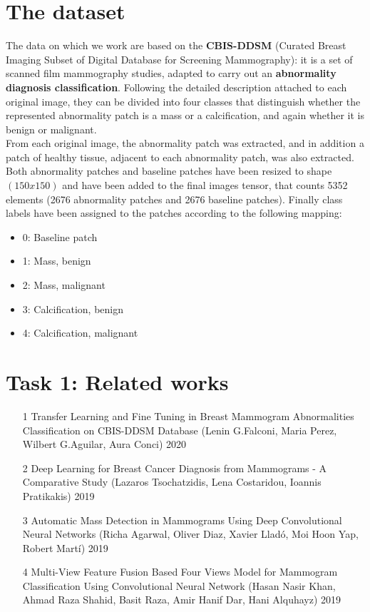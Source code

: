 \documentclass[11pt,a4paper,oneside]{article}
\begin{document}
\section{The dataset}
The data on which we work are based on the \textbf{CBIS-DDSM} (Curated Breast Imaging Subset of Digital Database for Screening Mammography): it is a set of scanned film mammography studies, adapted to carry out an \textbf{abnormality diagnosis classification}. Following the detailed description attached to each original image, they can be divided into four classes that distinguish whether the represented abnormality patch is a mass or a calcification, and again whether it is benign or malignant. \\
From each original image, the abnormality patch was extracted, and in addition a patch of healthy tissue, adjacent to each abnormality patch, was also extracted. Both abnormality patches and baseline patches have been resized to shape $(150x150)$ and have been added to the final images tensor, that counts 5352 elements (2676 abnormality patches and 2676 baseline patches).
Finally class labels have been assigned to the patches according to the following mapping:
\begin{itemize}
\item 0: Baseline patch
\item 1: Mass, benign
\item 2: Mass, malignant
\item 3: Calcification, benign
\item 4: Calcification, malignant
\end{itemize}

\section{Task 1: Related works}
\begin{itemize}
\item [1] Transfer Learning and Fine Tuning in Breast Mammogram Abnormalities Classification on CBIS-DDSM Database (Lenin G.Falconi, Maria Perez, Wilbert G.Aguilar, Aura Conci) 2020
\item [2] Deep Learning for Breast Cancer Diagnosis from Mammograms - A Comparative Study (Lazaros Tsochatzidis, Lena Costaridou, Ioannis Pratikakis) 2019
\item [3] Automatic Mass Detection in Mammograms Using Deep Convolutional Neural Networks (Richa Agarwal, Oliver Diaz, Xavier Lladó, Moi Hoon Yap, Robert Martí) 2019
\item [4] Multi-View Feature Fusion Based Four Views Model for Mammogram Classification Using Convolutional Neural Network (Hasan Nasir Khan, Ahmad Raza Shahid, Basit Raza,
Amir Hanif Dar, Hani Alquhayz) 2019
\end{itemize}
\end{document}
